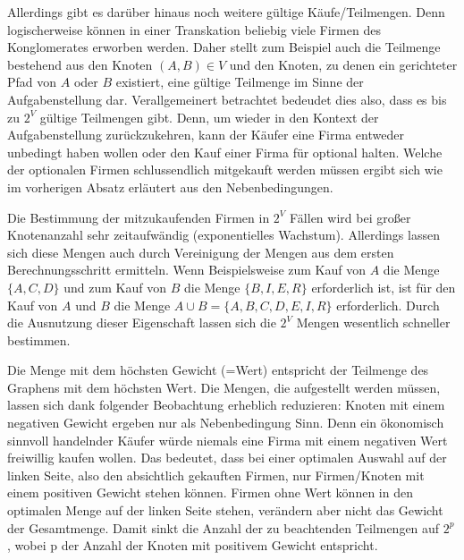 Allerdings gibt es darüber hinaus noch weitere gültige Käufe/Teilmengen. Denn logischerweise können in einer Transkation beliebig viele Firmen des Konglomerates erworben werden. Daher stellt zum Beispiel auch die Teilmenge bestehend aus den Knoten \((A, B) \in V\) und den Knoten, zu denen ein gerichteter Pfad von \(A\) oder \(B\) existiert, eine gültige Teilmenge im Sinne der Aufgabenstellung dar. Verallgemeinert betrachtet bedeudet dies also, dass es bis zu \(2^V\) gültige Teilmengen gibt. Denn, um wieder in den Kontext der Aufgabenstellung zurückzukehren, kann der Käufer eine Firma entweder unbedingt haben wollen oder den Kauf einer Firma für optional halten. Welche der optionalen Firmen schlussendlich mitgekauft werden müssen ergibt sich wie im vorherigen Absatz erläutert aus den Nebenbedingungen.

Die Bestimmung der mitzukaufenden Firmen in \(2^V\) Fällen wird bei großer Knotenanzahl sehr zeitaufwändig (exponentielles Wachstum). Allerdings lassen sich diese Mengen auch durch Vereinigung der Mengen aus dem ersten Berechnungsschritt ermitteln. Wenn Beispielsweise zum Kauf von \(A\) die Menge \(\{A, C, D\}\) und zum Kauf von \(B\) die Menge \(\{B, I, E, R\}\) erforderlich ist, ist für den Kauf von \(A\) und \(B\) die Menge \(A \cup B = \{A, B, C, D, E, I, R\}\) erforderlich. Durch die Ausnutzung dieser Eigenschaft lassen sich die \(2^V\) Mengen wesentlich schneller bestimmen.

Die Menge mit dem höchsten Gewicht (=Wert) entspricht der Teilmenge des Graphens mit dem höchsten Wert.
Die Mengen, die aufgestellt werden müssen, lassen sich dank folgender Beobachtung erheblich reduzieren:
Knoten mit einem negativen Gewicht ergeben nur als Nebenbedingung Sinn. Denn ein ökonomisch sinnvoll handelnder Käufer würde niemals eine Firma mit einem negativen Wert freiwillig kaufen wollen. Das bedeutet, dass bei einer optimalen Auswahl auf der linken Seite, also den absichtlich gekauften Firmen, nur Firmen/Knoten mit einem positiven Gewicht stehen können. Firmen ohne Wert können in den optimalen Menge auf der linken Seite stehen, verändern aber nicht das Gewicht der Gesamtmenge. Damit sinkt die Anzahl der zu beachtenden Teilmengen auf \(2^p\), wobei p der Anzahl der Knoten mit positivem Gewicht entspricht.

